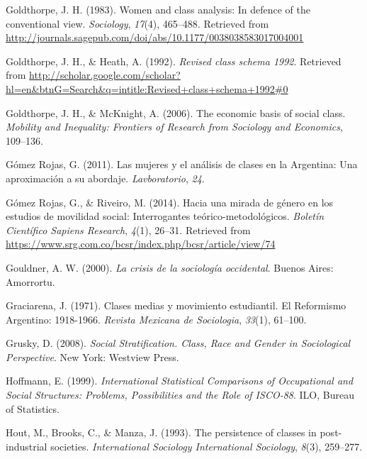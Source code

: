 \documentclass[
]{article}
\newlength{\cslhangindent}
\newlength{\cslentryspacingunit} %
\newenvironment{CSLReferences}[2] %
 {%
  \setlength{\parindent}{0pt}
  \ifodd #1
  \let\oldpar\par
  \def\par{\hangindent=\cslhangindent\oldpar}
  \fi
  \setlength{\parskip}{#2\cslentryspacingunit}
 }%
 {}
\begin{document}
\begin{CSLReferences}{1}{0}
\leavevmode{}%
Goldthorpe, J. H. (1983). Women and class analysis: In defence of the conventional view. \emph{Sociology}, \emph{17}(4), 465--488. Retrieved from \url{http://journals.sagepub.com/doi/abs/10.1177/0038038583017004001}

\leavevmode{}%
Goldthorpe, J. H., \& Heath, A. (1992). \emph{Revised class schema 1992}. Retrieved from \url{http://scholar.google.com/scholar?hl=en\&btnG=Search\&q=intitle:Revised+class+schema+1992\#0}

\leavevmode{}%
Goldthorpe, J. H., \& McKnight, A. (2006). The economic basis of social class. \emph{Mobility and Inequality: Frontiers of Research from Sociology and Economics}, 109--136.

\leavevmode{}%
Gómez Rojas, G. (2011). Las mujeres y el análisis de clases en la {Argentina}: Una aproximación a su abordaje. \emph{Lavboratorio}, \emph{24}.

\leavevmode{}%
Gómez Rojas, G., \& Riveiro, M. (2014). Hacia una mirada de género en los estudios de movilidad social: Interrogantes teórico-metodológicos. \emph{Boletín Científico Sapiens Research}, \emph{4}(1), 26--31. Retrieved from \url{https://www.srg.com.co/bcsr/index.php/bcsr/article/view/74}

\leavevmode{}%
Gouldner, A. W. (2000). \emph{La crisis de la sociología occidental}. Buenos Aires: Amorrortu.

\leavevmode{}%
Graciarena, J. (1971). Clases medias y movimiento estudiantil. {El} {Reformismo} {Argentino}: 1918-1966. \emph{Revista Mexicana de Sociologia}, \emph{33}(1), 61--100.

\leavevmode{}%
Grusky, D. (2008). \emph{Social {Stratification}. {Class}, {Race} and {Gender} in {Sociological} {Perspective}}. New York: Westview Press.

\leavevmode{}%
Hoffmann, E. (1999). \emph{International {Statistical} {Comparisons} of {Occupational} and {Social} {Structures}: {Problems}, {Possibilities} and the {Role} of {ISCO}-88}. ILO, Bureau of Statistics.

\leavevmode{}%
Hout, M., Brooks, C., \& Manza, J. (1993). The persistence of classes in post-industrial societies. \emph{International Sociology International Sociology}, \emph{8}(3), 259--277.


\end{CSLReferences}
\end{document}
